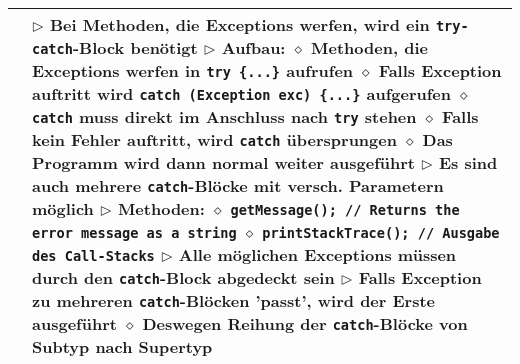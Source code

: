 \begin{tabular}{ | p{4cm} p{13.5cm} | }
	\makecell[l]{Exception fangen} & \makecell[l]{$\rhd$ Bei Methoden, die Exceptions werfen, wird ein \texttt{try-catch}-Block benötigt \\
	$\rhd$ Aufbau: \\
	\hspace{0.4cm} $\diamond$ Methoden, die Exceptions werfen in \texttt{try \{...\}} aufrufen \\
	\hspace{0.4cm} $\diamond$ Falls Exception auftritt wird \texttt{catch (Exception exc) \{...\}} aufgerufen \\
	\hspace{0.4cm} $\diamond$ \texttt{catch} muss direkt im Anschluss nach \texttt{try} stehen \\
	\hspace{0.4cm} $\diamond$ Falls kein Fehler auftritt, wird \texttt{catch} übersprungen \\
	\hspace{0.4cm} $\diamond$ Das Programm wird dann normal weiter ausgeführt \\
	$\rhd$ Es sind auch mehrere \texttt{catch}-Blöcke mit versch. Parametern möglich \\
	$\rhd$ Methoden: \\
	\hspace{0.4cm} $\diamond$ \texttt{getMessage(); // Returns the error message as a string} \\
	\hspace{0.4cm} $\diamond$ \texttt{printStackTrace(); // Ausgabe des Call-Stacks} \\
	$\rhd$ Alle möglichen Exceptions müssen durch den \texttt{catch}-Block abgedeckt sein \\
	$\rhd$ Falls Exception zu mehreren \texttt{catch}-Blöcken 'passt', wird der Erste ausgeführt \\
	\hspace{0.4cm} $\diamond$ Deswegen Reihung der \texttt{catch}-Blöcke von Subtyp nach Supertyp} \\ \hline
	
	\end{tabular}

